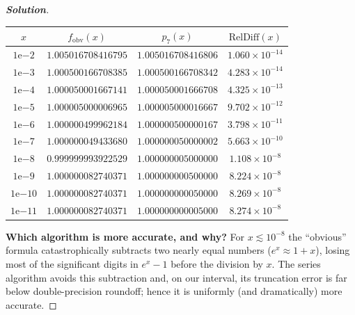 \documentclass[11pt]{article}
\newenvironment{solution}{%
  \begin{proof}[\textbf{Solution}]$ $\par\nobreak\ignorespaces
}{%
  \end{proof}
}
\theoremstyle{definition}
\begin{document}
\begin{solution}
\medskip
\begin{tabular}{c c c c}
\hline
$x$ & $f_{\text{obv}}(x)$ & $p_7(x)$ & $\mathrm{RelDiff}(x)$\\
\hline
$1\mathrm{e}{-2}$ & $1.005016708416795$ & $1.005016708416806$ & $1.060\times 10^{-14}$\\
$1\mathrm{e}{-3}$ & $1.000500166708385$ & $1.000500166708342$ & $4.283\times 10^{-14}$\\
$1\mathrm{e}{-4}$ & $1.000050001667141$ & $1.000050001666708$ & $4.325\times 10^{-13}$\\
$1\mathrm{e}{-5}$ & $1.000005000006965$ & $1.000005000016667$ & $9.702\times 10^{-12}$\\
$1\mathrm{e}{-6}$ & $1.000000499962184$ & $1.000000500000167$ & $3.798\times 10^{-11}$\\
$1\mathrm{e}{-7}$ & $1.000000049433680$ & $1.000000050000002$ & $5.663\times 10^{-10}$\\
$1\mathrm{e}{-8}$ & $0.999999993922529$ & $1.000000005000000$ & $1.108\times 10^{-8}$\\
$1\mathrm{e}{-9}$ & $1.000000082740371$ & $1.000000000500000$ & $8.224\times 10^{-8}$\\
$1\mathrm{e}{-10}$ & $1.000000082740371$ & $1.000000000050000$ & $8.269\times 10^{-8}$\\
$1\mathrm{e}{-11}$ & $1.000000082740371$ & $1.000000000005000$ & $8.274\times 10^{-8}$\\
\hline
\end{tabular}
\par\medskip

\textbf{Which algorithm is more accurate, and why?}  
For $x\lesssim 10^{-8}$ the “obvious” formula catastrophically subtracts two nearly equal numbers ($e^x\approx 1+x$), losing most of the significant digits in $e^x-1$ before the division by $x$. The series algorithm avoids this subtraction and, on our interval, its truncation error is far below double-precision roundoff; hence it is uniformly (and dramatically) more accurate.
\end{solution}


\newpage
\end{document}
